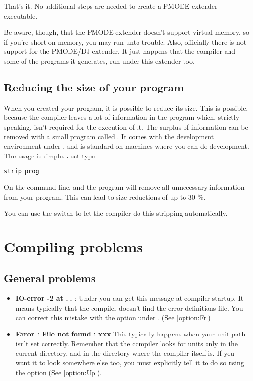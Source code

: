 \documentclass{report}
\newcommand{\seeo}[1]{See \ref{option:#1}}
\begin{document}
That's it. No additional steps are needed to create a PMODE extender
executable.

Be aware, though, that the PMODE extender doesn't support virtual memory, so
if you're short on memory, you may run unto trouble. Also, officially there
is not support for the PMODE/DJ extender. It just happens that the compiler
and some of the programs it generates, run under this extender too.


\section{Reducing the size of your program}

When you created your program, it is possible to reduce its size. This
is possible, because the compiler leaves a lot of information in the
program which, strictly speaking, isn't required for the execution of
it. The surplus of information can be removed with a small program
called . It comes with the  development
environment under \dos, and is standard on \linux machines where you can
do development. The usage is simple. Just type
\begin{verbatim}
strip prog
\end{verbatim}
On the command line, and the  program will remove all unnecessary
information from your program. This can lead to size reductions of up to
30 \%.

You can use the  switch to let the compiler do this stripping
automatically. 

\chapter{Compiling problems}

\section{General problems}
\begin{itemize}
\item \textbf{IO-error -2 at ...} : Under \linux you can get this message at
compiler startup. It means typically that the compiler doesn't find the
error definitions file. You can correct this mistake with the 
option under \linux. (\seeo{Fr})
\item \textbf {Error : File not found : xxx} This typically happens when
your unit path isn't set correctly. Remember that the compiler looks for
units only in the current directory, and in the directory where the compiler
itself is. If you want it to look somewhere else too, you must explicitly
tell it to do so using the  option (\seeo{Up}).
\end{itemize}
\end{document}
